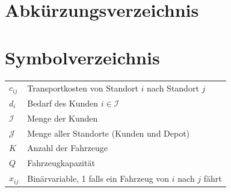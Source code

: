 \documentclass[11pt,a4paper]{article}
\begin{document}
\section*{Abkürzungsverzeichnis}
\begin{acronym}[VRP]
\end{acronym}

\newpage
{}
\section*{Symbolverzeichnis}
\begin{tabular}{p{} p{}}
	$c_{ij}$ & Transportkosten von Standort $i$ nach Standort $j$\\
	$d_i$ & Bedarf des Kunden $i \in \mathcal{I}$\\
	$\mathcal{I}$ & Menge der Kunden\\
	$\mathcal{J}$ & Menge aller Standorte (Kunden und Depot)\\
	$K$ & Anzahl der Fahrzeuge\\
	$Q$ & Fahrzeugkapazität\\
	$x_{ij}$ & Binärvariable, 1 falls ein Fahrzeug von $i$ nach $j$ fährt
\end{tabular}

\newpage
{}
\end{document}
